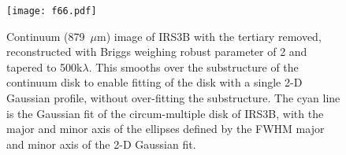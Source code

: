 \documentclass[twocolumn, 12pt]{aastex63}
\renewcommand{\micron}{$\mu$m}
\begin{document}
\begin{figure}[H]
  \begin{center}
   \texttt{[image: f66.pdf]}
   \end{center}
   \caption{Continuum (879~\micron) image of IRS3B with the tertiary removed, reconstructed with Briggs weighing robust parameter of 2 and tapered to 500k$\lambda$. This smooths over the substructure of the continuum disk to enable fitting of the disk with a single 2-D Gaussian profile, without over-fitting the substructure. The cyan line is the Gaussian fit of the circum-multiple disk of IRS3B, with the major and minor axis of the ellipses defined by the FWHM major and minor axis of the 2-D Gaussian fit.} \label{fig:subclumptaper}
\end{figure}
\end{document}
